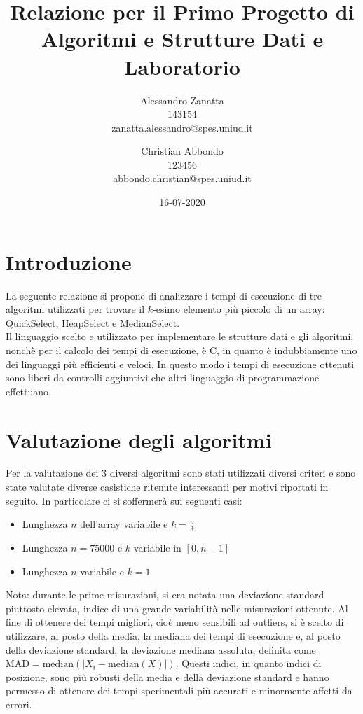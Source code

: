\documentclass{article}
\title{Relazione per il Primo Progetto di Algoritmi e Strutture Dati e Laboratorio}
\date{16-07-2020}
\author{Alessandro Zanatta \\ 143154 \\ zanatta.alessandro@spes.uniud.it \and Christian Abbondo \\ 123456 \\ abbondo.christian@spes.uniud.it}
\begin{document}
	\maketitle
	\newpage
	
	
	\tableofcontents	
	\newpage
	
	\section{Introduzione}
	La seguente relazione si propone di analizzare i tempi di esecuzione di tre algoritmi utilizzati per trovare il $ k $-esimo elemento più piccolo di un array: QuickSelect, HeapSelect e MedianSelect.
	\\ 
	Il linguaggio scelto e utilizzato per implementare le strutture dati e gli algoritmi, nonchè per il calcolo dei tempi di esecuzione, è C, in quanto è indubbiamente uno dei linguaggi più efficienti e veloci. In questo modo i tempi di esecuzione ottenuti sono liberi da controlli aggiuntivi che altri linguaggio di programmazione effettuano.
	\newpage
	
	
	\section{Valutazione degli algoritmi}
	Per la valutazione dei 3 diversi algoritmi sono stati utilizzati diversi criteri e sono state valutate diverse casistiche ritenute interessanti per motivi riportati in seguito. In particolare ci si soffermerà sui seguenti casi:
	
	\begin{itemize}
		\item Lunghezza $n$ dell'array variabile e $k=\frac{n}{3}$
		\item Lunghezza $n=75000$ e $k$ variabile in $[0,n-1]$
		\item Lunghezza $n$ variabile e $k=1$
	\end{itemize}
	
	Nota: durante le prime misurazioni, si era notata una deviazione standard piuttosto elevata, indice di una grande variabilità nelle misurazioni ottenute. Al fine di ottenere dei tempi migliori, cioè meno sensibili ad outliers, si è scelto di utilizzare, al posto della media, la mediana dei tempi di esecuzione e, al posto della deviazione standard, la deviazione mediana assoluta, definita come $\textrm{MAD}=\textrm{median}\left(\mathopen|X_{i}-\textrm{median}\left(X\right)\mathopen|\right)$. Questi indici, in quanto indici di posizione, sono più robusti della media e della deviazione standard e hanno permesso di ottenere dei tempi sperimentali più accurati e minormente affetti da errori.
	\newpage
\end{document}
